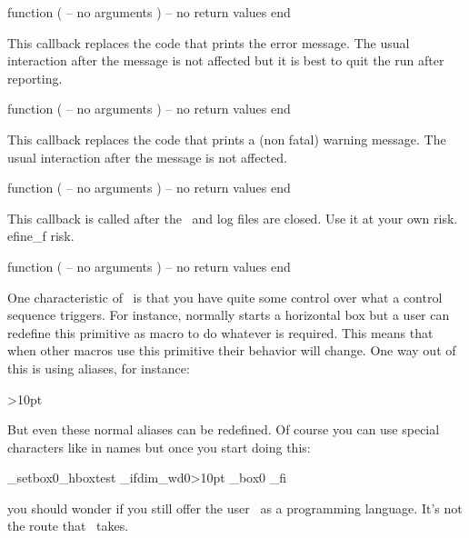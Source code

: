 \starttyping[option=LUA]
function (
    -- no arguments
)
    -- no return values
end
\stoptyping

\stopsubsection

\startsubsection[title=show_error_message]

This callback replaces the code that prints the error message. The usual
interaction after the message is not affected but it is best to quit the run
after reporting.

\starttyping[option=LUA]
function (
    -- no arguments
)
    -- no return values
end
\stoptyping

\stopsubsection

\startsubsection[title=show_warning_message]

This callback replaces the code that prints a (non fatal) warning message. The
usual interaction after the message is not affected.

\starttyping[option=LUA]
function (
    -- no arguments
)
    -- no return values
end
\stoptyping

\stopsubsection

\startsubsection[title=wrapup_run]


This callback is called after the \PDF\ and log files are closed. Use it at your own
risk. efine_f
risk.

\starttyping[option=LUA]
function (
    -- no arguments
)
    -- no return values
end
\stoptyping

\stopsubsection

\startsubsection[title=handle_overload]

One characteristic of \TEX\ is that you have quite some control over what a
control sequence triggers. For instance, \type {\hbox} normally starts a
horizontal box but a user can redefine this primitive as macro to do whatever is
required. This means that when other macros use this primitive their behavior
will change. One way out of this is using aliases, for instance:

\starttyping
{}
\normalifdim{}>10pt  \normalfi
\stoptyping

But even these normal aliases can be redefined. Of course you can use special
characters like \type {_} in names but once you start doing this:

\starttyping
\p_setbox0\p_hbox{test}
\p_ifdim\p_wd0>10pt \p_box0 \p_fi
\stoptyping

you should wonder if you still offer the user \TEX\ as a programming language.
It's not the route that \CONTEXT\ takes.

